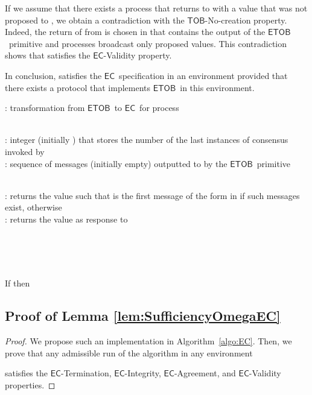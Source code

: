 \documentclass[11pt]{article}
\newcommand{\EC}{\ensuremath{\mathsf{EC}}}
\newcommand{\ETOB}{\ensuremath{\mathsf{ETOB}}}
\newcommand{\TOB}{\ensuremath{\mathsf{TOB}}}
\begin{document}
{If we assume that there exists a process  that returns to  with  a value that was not proposed to , we obtain a contradiction with the \TOB-No-creation property. Indeed, the return of  from  is chosen in  that contains the output of the \ETOB~primitive and processes broadcast only proposed values. This contradiction shows that  satisfies the \EC-Validity property.

In conclusion,  satisfies the \EC~specification in an environment  provided that there exists a protocol that implements \ETOB~in this environment.


\begin{algorithm}
\caption{: transformation from \ETOB~to \EC~for process }\label{algo:ETOBtoEC}
\small
\begin{description}\itemsep0pt
\item[Internal variables:]~\\
: integer (initially ) that stores the number of the last instances of consensus invoked by \\
: sequence of messages (initially empty) outputted to  by the \ETOB~primitive

\item[Functions:]~\\
: returns the value  such that  is the first message of the form  in  if such messages exist,  otherwise\\
: returns the value  as response to 

\item[On invocation of ]~\\
\\


\item[On local time out]~\\
If  then\\

\end{description}
\normalsize
\end{algorithm}

\subsection{Proof of Lemma \ref{lem:SufficiencyOmegaEC}}\label{sec:SufficiencyOmegaEC}

\begin{proof}
We propose such an implementation in Algorithm~\ref{algo:EC}. Then, we
prove that any admissible run  of the algorithm in any environment

satisfies the \EC-Termination, \EC-Integrity, \EC-Agreement, and \EC-Validity properties.


\end{proof}}
\end{document}
